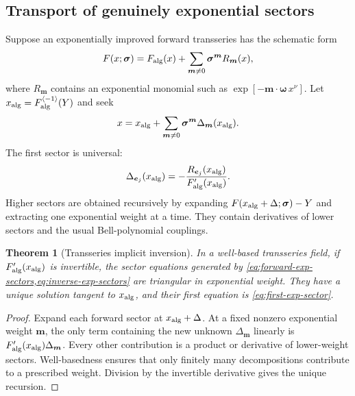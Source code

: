 \documentclass[11pt,a4paper]{article}
\numberwithin{equation}{section}
\newtheorem{theorem}{Theorem}[section]
\theoremstyle{definition}
\theoremstyle{remark}
\newcommand{\cinv}{\langle-1\rangle}
\begin{document}
\subsection{Transport of genuinely exponential sectors}

Suppose an exponentially improved forward transseries has the schematic
form
\begin{equation}
 F(x;\bm\sigma)=F_{\rm alg}(x)
 +\sum_{\bm m\ne0}\bm\sigma^{\bm m}R_{\bm m}(x),
 \label{eq:forward-exp-sectors}
\end{equation}
where \(R_{\bm m}\) contains an exponential monomial such as
\(\exp[-\bm m\cdot\bm\omega\,x^\nu]\).  Let
\(x_{\rm alg}=F_{\rm alg}^{\cinv}(Y)\) and seek
\begin{equation}
 x=x_{\rm alg}+\sum_{\bm m\ne0}
 \bm\sigma^{\bm m}\Delta_{\bm m}(x_{\rm alg}).
 \label{eq:inverse-exp-sectors}
\end{equation}
The first sector is universal:
\begin{equation}
 \Delta_{\bm e_j}(x_{\rm alg})
 =-\frac{R_{\bm e_j}(x_{\rm alg})}
 {F_{\rm alg}'(x_{\rm alg})}.
 \label{eq:first-exp-sector}
\end{equation}
Higher sectors are obtained recursively by expanding
\(F(x_{\rm alg}+\Delta;\bm\sigma)-Y\) and extracting one exponential
weight at a time.  They contain derivatives of lower sectors and the usual
Bell-polynomial couplings.

\begin{theorem}[Transseries implicit inversion]\label{thm:transseries-implicit}
In a well-based transseries field, if \(F_{\rm alg}'(x_{\rm alg})\) is
invertible, the sector equations generated by
\cref{eq:forward-exp-sectors,eq:inverse-exp-sectors} are triangular in
exponential weight.  They have a unique solution tangent to
\(x_{\rm alg}\), and their first equation is \cref{eq:first-exp-sector}.
\end{theorem}

\begin{proof}
Expand each forward sector at \(x_{\rm alg}+\Delta\).  At a fixed nonzero
exponential weight \(\bm m\), the only term containing the new unknown
\(\Delta_{\bm m}\) linearly is
\(F_{\rm alg}'(x_{\rm alg})\Delta_{\bm m}\).  Every other contribution is
a product or derivative of lower-weight sectors.  Well-basedness ensures
that only finitely many decompositions contribute to a prescribed weight.
Division by the invertible derivative gives the unique recursion.
\end{proof}
\end{document}
